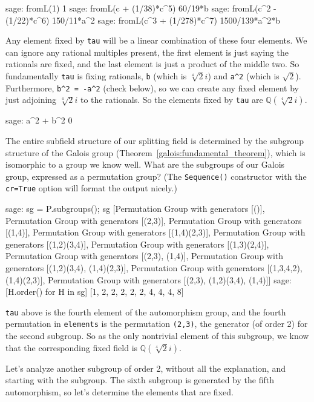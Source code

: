 %
\begin{sageexample}
sage: fromL(1)
1
sage: fromL(c + (1/38)*c^5)
60/19*b
sage: fromL(c^2 - (1/22)*c^6)
150/11*a^2
sage: fromL(c^3 + (1/278)*c^7)
1500/139*a^2*b
\end{sageexample}
%
Any element fixed by \verb?tau? will be a linear combination of these four elements.  We can ignore any rational multiples present, the first element is just saying the rationals are fixed, and the last element is just a product of the middle two.  So fundamentally \verb?tau? is fixing rationals, \verb?b? (which is $\sqrt[4]{2}i$) and \verb?a^2? (which is $\sqrt{2}$).  Furthermore, \verb?b^2 = -a^2? (check below), so we can create any fixed element by just adjoining $\sqrt[4]{2}i$ to the rationals.  So the elements fixed by \verb?tau? are ${\mathbb Q}(\sqrt[4]{2}i)$.
%
\begin{sageexample}
sage: a^2 + b^2
0
\end{sageexample}
%
%
%
The entire subfield structure of our splitting field is determined by the subgroup structure of the Galois group (Theorem~\ref{galois:fundamental_theorem}), which is isomorphic to a group we know well.  What are the subgroups of our Galois group, expressed as a permutation group? (The \verb?Sequence()? constructor with the \verb?cr=True? option will format the output nicely.)
%
\begin{sageexample}
sage: sg = P.subgroups(); sg
[Permutation Group with generators [()],
 Permutation Group with generators [(2,3)],
 Permutation Group with generators [(1,4)],
 Permutation Group with generators [(1,4)(2,3)],
 Permutation Group with generators [(1,2)(3,4)],
 Permutation Group with generators [(1,3)(2,4)],
 Permutation Group with generators [(2,3), (1,4)],
 Permutation Group with generators [(1,2)(3,4), (1,4)(2,3)],
 Permutation Group with generators [(1,3,4,2), (1,4)(2,3)],
 Permutation Group with generators [(2,3), (1,2)(3,4), (1,4)]]
sage: [H.order() for H in sg]
[1, 2, 2, 2, 2, 2, 4, 4, 4, 8]
\end{sageexample}
%
\verb?tau? above is the fourth element of the automorphism group, and the fourth permutation in \verb?elements? is the permutation \verb?(2,3)?, the generator (of order 2) for the second subgroup.  So as the only nontrivial element of this subgroup, we know that the corresponding fixed field is ${\mathbb Q}(\sqrt[4]{2}i)$.\par
%
Let's analyze another subgroup of order 2, without all the explanation, and starting with the subgroup.  The sixth subgroup is generated by the fifth automorphism, so let's determine the elements that are fixed.
